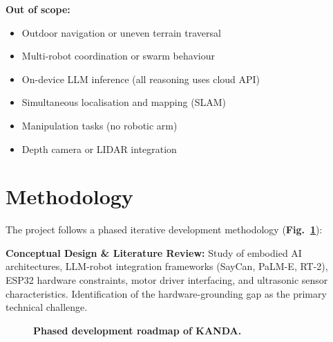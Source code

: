 \textbf{Out of scope:}
\begin{itemize}[nosep]
  \item Outdoor navigation or uneven terrain traversal
  \item Multi-robot coordination or swarm behaviour
  \item On-device LLM inference (all reasoning uses cloud API)
  \item Simultaneous localisation and mapping (SLAM)
  \item Manipulation tasks (no robotic arm)
  \item Depth camera or LIDAR integration
\end{itemize}

\section{Methodology}
\label{sec:methodology}

The project follows a phased iterative development methodology (\textbf{Fig.~\ref{fig:phases}}):


\textbf{Conceptual Design \& Literature Review:} Study of embodied AI architectures, LLM-robot integration frameworks (SayCan, PaLM-E, RT-2), ESP32 hardware constraints, motor driver interfacing, and ultrasonic sensor characteristics. Identification of the hardware-grounding gap as the primary technical challenge.

\begin{figure}[H]
\centering
{}
\caption[Phased development roadmap of KANDA]{\textbf{Phased development roadmap of KANDA.}}
\label{fig:phases}
\end{figure}

